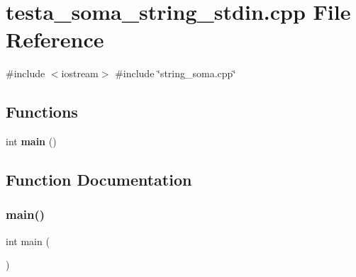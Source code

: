 \section{testa\+\_\+soma\+\_\+string\+\_\+stdin.\+cpp File Reference}
\label{testa__soma__string__stdin_8cpp}
{\ttfamily \#include $<$iostream$>$}\newline
{\ttfamily \#include \char`\"{}string\+\_\+soma.\+cpp\char`\"{}}\newline
\subsection*{Functions}
\begin{DoxyCompactItemize}
\item 
int \textbf{ main} ()
\end{DoxyCompactItemize}


\subsection{Function Documentation}
\mbox{\label{testa__soma__string__stdin_8cpp_ae66f6b31b5ad750f1fe042a706a4e3d4}} 
\subsubsection{main()}
{\footnotesize\ttfamily int main (\begin{DoxyParamCaption}{ }\end{DoxyParamCaption})}

